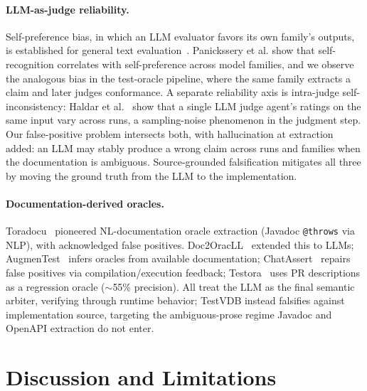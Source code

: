 \documentclass[sigconf]{acmart}
\begin{document}
\paragraph{LLM-as-judge reliability.}
Self-preference bias, in which an LLM evaluator favors its own family's outputs, is established for general text evaluation~\cite{panickssery24,wataoka24}. Panickssery et al. show that self-recognition correlates with self-preference across model families, and we observe the analogous bias in the test-oracle pipeline, where the same family extracts a claim and later judges conformance. A separate reliability axis is intra-judge self-inconsistency: Haldar et al.~\cite{haldar25} show that a single LLM judge agent's ratings on the same input vary across runs, a sampling-noise phenomenon in the judgment step. Our false-positive problem intersects both, with hallucination at extraction~\cite{ji23hall} added: an LLM may stably produce a wrong claim across runs and families when the documentation is ambiguous. Source-grounded falsification mitigates all three by moving the ground truth from the LLM to the implementation.

\paragraph{Documentation-derived oracles.}
Toradocu~\cite{toradocu16} pioneered NL-documentation oracle extraction (Javadoc \texttt{@throws} via NLP), with acknowledged false positives. Doc2OracLL~\cite{doc2oracll25} extended this to LLMs; AugmenTest~\cite{augmentest25} infers oracles from available documentation; ChatAssert~\cite{chatassert24} repairs false positives via compilation/execution feedback; Testora~\cite{testora26} uses PR descriptions as a regression oracle ($\sim$55\% precision). All treat the LLM as the final semantic arbiter, verifying through runtime behavior; TestVDB instead falsifies against implementation source, targeting the ambiguous-prose regime Javadoc and OpenAPI extraction do not enter.

\section{Discussion and Limitations}
\label{sec:disc}
\end{document}
